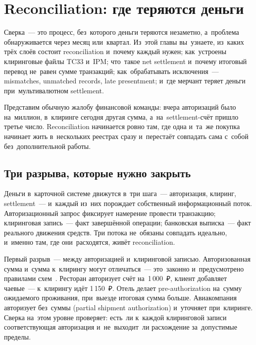 \chapter{Reconciliation: где теряются деньги}
\label{ch:reconciliation}

\begin{kaobox}[title=Что вы узнаете из этой главы]
  Сверка~--- это процесс, без~которого деньги теряются незаметно, а~проблема
  обнаруживается через месяц или~квартал. Из~этой главы вы~узнаете, из~каких
  трёх слоёв состоит reconciliation и~почему каждый нужен; как~устроены
  клиринговые файлы TC33 и~IPM; что~такое net settlement и~почему итоговый
  перевод не~равен сумме транзакций; как~обрабатывать исключения~---
  mismatches, unmatched records, late presentment; и~где мерчант теряет
  деньги при~мультивалютном settlement.
\end{kaobox}

Представим обычную жалобу финансовой команды: вчера авторизаций
было на~миллион, в~клиринге сегодня другая сумма, а~на~settlement-счёт
пришло третье число. Reconciliation начинается ровно там, где одна
и~та~же покупка начинает жить в~нескольких реестрах сразу и~перестаёт
совпадать сама с~собой без~дополнительной работы.


\section{Три разрыва, которые нужно закрыть}
\label{sec:recon-gaps}

Деньги в~карточной системе движутся в~три шага~--- авторизация, клиринг,
settlement~--- и~каждый из~них порождает собственный информационный поток.
Авторизационный запрос фиксирует намерение провести транзакцию;
клиринговая запись~--- факт завершённой операции; банковская выписка~---
факт реального движения средств. Три потока не~обязаны совпадать идеально,
и~именно там, где они~расходятся, живёт reconciliation.

Первый разрыв~--- между авторизацией и~клиринговой записью. Авторизованная
сумма и~сумма к~клирингу могут отличаться~--- это~законно и~предусмотрено
правилами схем~. Ресторан авторизует счёт на~1\,000~₽,
клиент добавляет чаевые~--- к~клирингу идёт 1\,150~₽. Отель делает
pre-authorization на~сумму ожидаемого проживания, при~выезде итоговая сумма
больше. Авиакомпания авторизует без~суммы (partial shipment authorization)
и~уточняет при~клиринге. Сверка на~этом уровне проверяет: есть~ли
к~каждой клиринговой записи соответствующая авторизация и~не~выходит~ли
расхождение за~допустимые пределы.

